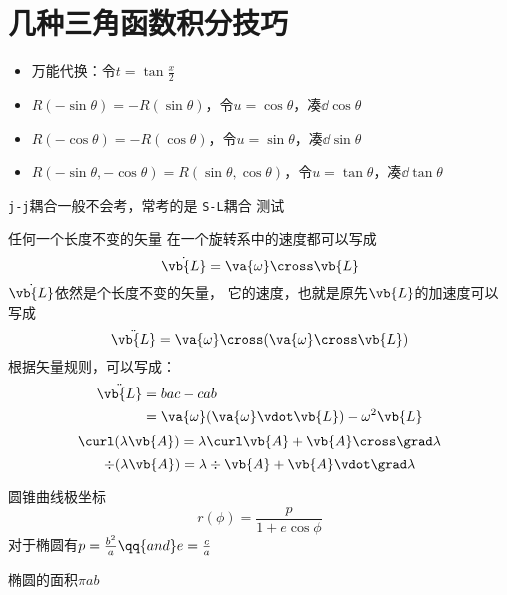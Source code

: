 
\section{几种三角函数积分技巧}%
\begin{itemize}
	\item 万能代换：令\(t=\tan \frac{x}{2}\)
	\item \( R( -\sin \theta) = - R(\sin \theta) \)，令\(u = \cos \theta\)，凑\(\dd \cos \theta\)
	\item \( R( -\cos \theta) = - R(\cos \theta) \)，令\(u = \sin \theta\)，凑\(\dd \sin \theta\)
	\item \( R( -\sin \theta, -\cos \theta) = R(\sin \theta, \cos \theta) \)，令\(u = \tan \theta\)，凑\(\dd \tan \theta\)
\end{itemize}

\verb+j-j+耦合一般不会考，常考的是 \verb+S-L+耦合
测试

任何一个长度不变的矢量
在一个旋转系中的速度都可以写成
\begin{equation*}
	\dot{\vb{L}} = \va{\omega} \cross \vb{L}
\end{equation*}
\(\dot{\vb{L}}\)依然是个长度不变的矢量，
它的速度，也就是原先\(\vb{L}\)的加速度可以写成
\begin{equation*}
	\ddot{\vb{L}} = \va{\omega} \cross ( \va{\omega} \cross \vb{L})
\end{equation*}
根据矢量规则，可以写成：
\begin{equation*}
	\begin{aligned}
		\ddot{\vb{L}} &= bac - cab \\
									&= \va{\omega} ( \va{\omega} \vdot \vb{L} ) - \omega^2 \vb{L}
	\end{aligned}
\end{equation*}
\begin{equation*}
	\curl(\lambda \vb{A}) = \lambda \curl \vb{A} + \vb{A} \cross \grad \lambda
\end{equation*}
\begin{equation*}
	\div(\lambda \vb{A}) = \lambda \div \vb{A} + \vb{A} \vdot \grad \lambda
\end{equation*}

圆锥曲线极坐标
\begin{equation*}
	r(\phi) = \frac{p}{1 + e \cos \phi} 
\end{equation*}
对于椭圆有\(p = \frac{b^2}{a} \qq{and} e = \frac{c}{a}\)

椭圆的面积\(\pi ab\)




